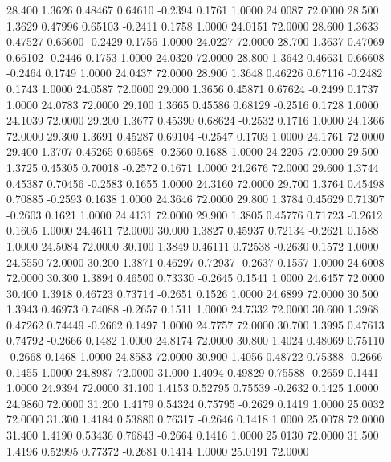  28.400   1.3626   0.48467   0.64610  -0.2394   0.1761   1.0000  24.0087  72.0000
  28.500   1.3629   0.47996   0.65103  -0.2411   0.1758   1.0000  24.0151  72.0000
  28.600   1.3633   0.47527   0.65600  -0.2429   0.1756   1.0000  24.0227  72.0000
  28.700   1.3637   0.47069   0.66102  -0.2446   0.1753   1.0000  24.0320  72.0000
  28.800   1.3642   0.46631   0.66608  -0.2464   0.1749   1.0000  24.0437  72.0000
  28.900   1.3648   0.46226   0.67116  -0.2482   0.1743   1.0000  24.0587  72.0000
  29.000   1.3656   0.45871   0.67624  -0.2499   0.1737   1.0000  24.0783  72.0000
  29.100   1.3665   0.45586   0.68129  -0.2516   0.1728   1.0000  24.1039  72.0000
  29.200   1.3677   0.45390   0.68624  -0.2532   0.1716   1.0000  24.1366  72.0000
  29.300   1.3691   0.45287   0.69104  -0.2547   0.1703   1.0000  24.1761  72.0000
  29.400   1.3707   0.45265   0.69568  -0.2560   0.1688   1.0000  24.2205  72.0000
  29.500   1.3725   0.45305   0.70018  -0.2572   0.1671   1.0000  24.2676  72.0000
  29.600   1.3744   0.45387   0.70456  -0.2583   0.1655   1.0000  24.3160  72.0000
  29.700   1.3764   0.45498   0.70885  -0.2593   0.1638   1.0000  24.3646  72.0000
  29.800   1.3784   0.45629   0.71307  -0.2603   0.1621   1.0000  24.4131  72.0000
  29.900   1.3805   0.45776   0.71723  -0.2612   0.1605   1.0000  24.4611  72.0000
  30.000   1.3827   0.45937   0.72134  -0.2621   0.1588   1.0000  24.5084  72.0000
  30.100   1.3849   0.46111   0.72538  -0.2630   0.1572   1.0000  24.5550  72.0000
  30.200   1.3871   0.46297   0.72937  -0.2637   0.1557   1.0000  24.6008  72.0000
  30.300   1.3894   0.46500   0.73330  -0.2645   0.1541   1.0000  24.6457  72.0000
  30.400   1.3918   0.46723   0.73714  -0.2651   0.1526   1.0000  24.6899  72.0000
  30.500   1.3943   0.46973   0.74088  -0.2657   0.1511   1.0000  24.7332  72.0000
  30.600   1.3968   0.47262   0.74449  -0.2662   0.1497   1.0000  24.7757  72.0000
  30.700   1.3995   0.47613   0.74792  -0.2666   0.1482   1.0000  24.8174  72.0000
  30.800   1.4024   0.48069   0.75110  -0.2668   0.1468   1.0000  24.8583  72.0000
  30.900   1.4056   0.48722   0.75388  -0.2666   0.1455   1.0000  24.8987  72.0000
  31.000   1.4094   0.49829   0.75588  -0.2659   0.1441   1.0000  24.9394  72.0000
  31.100   1.4153   0.52795   0.75539  -0.2632   0.1425   1.0000  24.9860  72.0000
  31.200   1.4179   0.54324   0.75795  -0.2629   0.1419   1.0000  25.0032  72.0000
  31.300   1.4184   0.53880   0.76317  -0.2646   0.1418   1.0000  25.0078  72.0000
  31.400   1.4190   0.53436   0.76843  -0.2664   0.1416   1.0000  25.0130  72.0000
  31.500   1.4196   0.52995   0.77372  -0.2681   0.1414   1.0000  25.0191  72.0000
